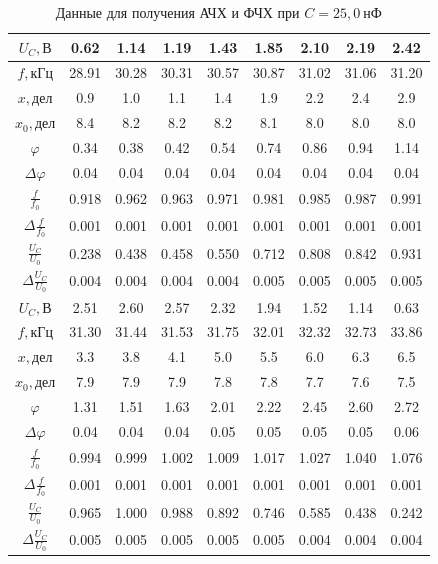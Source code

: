 \documentclass[12pt,a4paper]{article}
\begin{document}
\begin{table}[ht]\centering
\begin{tabular}{|*{9}{c|}}
\hline
$U_C, \text{В}$&0.62&1.14&1.19&1.43&1.85&2.10&2.19&2.42\\
\hline
$f, \text{кГц}$&28.91&30.28&30.31&30.57&30.87&31.02&31.06&31.20\\
\hline
$x, \text{дел}$&0.9&1.0&1.1&1.4&1.9&2.2&2.4&2.9\\
\hline
$x_0, \text{дел}$&8.4&8.2&8.2&8.2&8.1&8.0&8.0&8.0\\
\hline
$\varphi$&0.34&0.38&0.42&0.54&0.74&0.86&0.94&1.14\\
\hline
$\Delta\varphi$&0.04&0.04&0.04&0.04&0.04&0.04&0.04&0.04\\
\hline
$\frac{f}{f_0}$&0.918&0.962&0.963&0.971&0.981&0.985&0.987&0.991\\
\hline
$\Delta \frac{f}{f_0}$&0.001&0.001&0.001&0.001&0.001&0.001&0.001&0.001\\
\hline
$\frac{U_C}{U_0}$&0.238&0.438&0.458&0.550&0.712&0.808&0.842&0.931\\
\hline
$\Delta \frac{U_C}{U_0}$&0.004&0.004&0.004&0.004&0.005&0.005&0.005&0.005\\
\hline
$U_C, \text{В}$&2.51&2.60&2.57&2.32&1.94&1.52&1.14&0.63\\
\hline
$f, \text{кГц}$&31.30&31.44&31.53&31.75&32.01&32.32&32.73&33.86\\
\hline
$x, \text{дел}$&3.3&3.8&4.1&5.0&5.5&6.0&6.3&6.5\\
\hline
$x_0, \text{дел}$&7.9&7.9&7.9&7.8&7.8&7.7&7.6&7.5\\
\hline
$\varphi$&1.31&1.51&1.63&2.01&2.22&2.45&2.60&2.72\\
\hline
$\Delta\varphi$&0.04&0.04&0.04&0.05&0.05&0.05&0.05&0.06\\
\hline
$\frac{f}{f_0}$&0.994&0.999&1.002&1.009&1.017&1.027&1.040&1.076\\
\hline
$\Delta \frac{f}{f_0}$&0.001&0.001&0.001&0.001&0.001&0.001&0.001&0.001\\
\hline
$\frac{U_C}{U_0}$&0.965&1.000&0.988&0.892&0.746&0.585&0.438&0.242\\
\hline
$\Delta \frac{U_C}{U_0}$&0.005&0.005&0.005&0.005&0.005&0.004&0.004&0.004\\
\hline
\end{tabular}
\caption{Данные для получения АЧХ и ФЧХ при $C = 25,0~\text{нФ}$}
\end{table}
\end{document}
